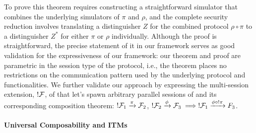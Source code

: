 To prove this theorem requires constructing a straightforward simulator that combines the underlying simulators of $\pi$ and $\rho$, and the complete security reduction involves translating a distinguisher $Z$ for the combined protocol $\rho \circ \pi$ to a distinguisher $Z^*$ for either $\pi$ or $\rho$ individually.
Although the proof is straightforward, the precise statement of it in our framework serves as good validation for the expressiveness of our framework: our theorem and proof are parametric in the session type of the protocol, i.e., the theorem places no restrictions on the communication pattern used by the underlying protocol and functionalities.
We further validate our approach by expressing the multi-session extension, $!\mathcal{F}$, of \F that let's \Z spawn arbitrary parallel sessions of \F and its corresponding composition theorem: 
$!\mathcal{F}_1 \xrightarrow{\pi} \mathcal{F}_2$, $!\mathcal{F}_2 \xrightarrow{\phi} \mathcal{F}_3 \implies !\mathcal{F}_1 \xrightarrow{\phi \circ !\pi} F_3$.



\paragraph{Universal Composability and ITMs}

